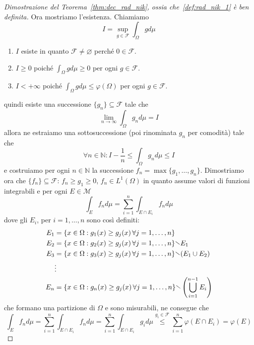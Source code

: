 \begin{proof}[Dimostrazione del Teorema~\ref{thm:dec_rad_nik}, ossia
    che~\ref{def:rad_nik_1} è ben definita]
    Ora mostriamo l'esistenza. Chiamiamo 
    \[
        I = \sup_{g \in \mathcal{F}} \int_\Omega g d\mu 
    \]
\begin{enumerate}[label = \arabic*.]
    \item \(I\) esiste in quanto \(\mathcal{F} \neq \varnothing\) perché \( 0
        \in \mathcal{F}\).
    \item  \(I \ge 0\) poiché \(\int_\Omega g d\mu \ge 0\) per ogni \(g \in
        \mathcal{F}\).
    \item \(I < +\infty\) poiché \(\int_\Omega g d\mu \le \varphi {(\Omega)}\) per
        ogni \(g \in \mathcal{F}\).
\end{enumerate}
    quindi esiste una successione \(\{g_{n}\} \subseteq \mathcal{F} \) tale che
    \[
        \lim_{n \to \infty} \int_\Omega g_{n} d\mu = I
    \]
    allora ne estraiamo una sottosuccessione (poi rinominata \(g_{n}\) per comodità) tale
    che
    \[
        \forall n \in \mathbb{N} : I - \frac{1}{n} \le \int_\Omega g_{n} d\mu
        \le I
    \]
    e costruiamo per ogni \(n \in \mathbb{N}\) la successione \(f_{n} = \max
    \{g_{1}, \dots,g_{n}\} \). Dimostriamo ora che \(\{f_{n}\} \subseteq \mathcal{F}
    \): \(f_{n} \ge g_{1} \ge 0\), \(f_{n} \in L^{1}{(\Omega)}\) in quanto
    assume valori di funzioni integrabili e per ogni \(E \in \mathcal{M}\)
    \[
        \int_E f_{n} d\mu = \sum_{i=1}^{n} \int_{E \cap E_{i}} f_{n} d\mu 
    \]
    dove gli \(E_{i}\), per \(i = 1,\dots, n\) sono così definiti:
    \begin{align*}
        E_{1} &= \{x \in \Omega : g_{1}{(x)}\ge g_{j} {(x)} \, \forall j = 1,
        \dots, n \}  \\
        E_{2} &= \{x \in \Omega : g_{2}{(x)}\ge g_{j} {(x)} \, \forall j = 1,
        \dots, n \} \sminus E_{1} \\
        E_{3} &= \{x \in \Omega : g_{3}{(x)}\ge g_{j} {(x)} \, \forall j = 1,
        \dots, n \} \sminus {(E_{1} \cup E_{2})}  \\
        &\vdots \\
            E_{n} &= \{x \in \Omega : g_{n}{(x)}\ge g_{j} {(x)} \, \forall j = 1,
        \dots, n \} \sminus \left( \bigcup_{i=1}^{n-1} E_{i} \right)
    \end{align*}
    che formano una partizione di \(\Omega\) e sono misurabili, ne consegue che 
    \[
        \int_E f_{n} d\mu = \sum_{i=1}^{n} \int_{E \cap E_{i}}   f_{n} d\mu =
        \sum_{i=1}^{n} \int_{E \cap E_{i}} g_{i} d\mu
        \overset{g_{i} \in \mathcal{F}}{\le }
        \sum_{i=1}^{n} \varphi {(E \cap E_{i})} = \varphi {(E)}
\]
\end{proof}
